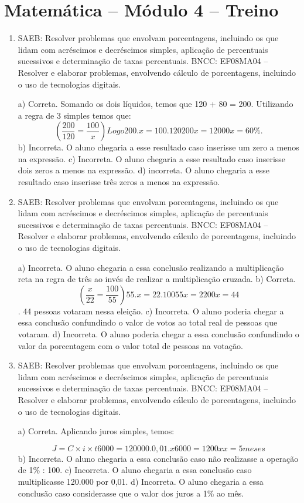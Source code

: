 \section*{Matemática – Módulo 4 – Treino}
\begin{enumerate}
\item SAEB: Resolver problemas que envolvam porcentagens, incluindo os que
lidam com acréscimos e decréscimos simples, aplicação de percentuais
sucessivos e determinação de taxas percentuais.
BNCC: EF08MA04 -- Resolver e elaborar problemas, envolvendo cálculo de
porcentagens, incluindo o uso de tecnologias digitais.

a) Correta. Somando os dois líquidos, temos que 120 + 80 = 200.
Utilizando a regra de 3 simples temos que:
$$(\frac{200}{120} = \frac{100}{x})
Logo 200 . x = 100 . 120
200 x = 12 000
x = 60\%.$$
b) Incorreta. O aluno chegaria a esse resultado caso inserisse um
zero a menos na expressão.
c) Incorreta. O aluno chegaria a esse resultado caso inserisse dois
zeros a menos na expressão.
d) incorreta. O aluno chegaria a esse resultado caso inserisse três
zeros a menos na expressão.

\item SAEB: Resolver problemas que envolvam porcentagens, incluindo os que
lidam com acréscimos e decréscimos simples, aplicação de percentuais
sucessivos e determinação de taxas percentuais.
BNCC: EF08MA04 -- Resolver e elaborar problemas, envolvendo cálculo de
porcentagens, incluindo o uso de tecnologias digitais.

a) Incorreta. O aluno chegaria a essa conclusão realizando a
multiplicação reta na regra de três ao invés de realizar a multiplicação
cruzada.
b) Correta. $$(\frac{x}{22} = \frac{100}{55})
55 . x = 22 . 100
55x = 2200
x = 44$$. 44 pessoas votaram nessa eleição.
c) Incorreta. O aluno poderia chegar a essa conclusão confundindo o
valor de votos ao total real de pessoas que votaram.
d) Incorreta. O aluno poderia chegar a essa conclusão confundindo o
valor da porcentagem com o valor total de pessoas na votação.

\item SAEB: Resolver problemas que envolvam porcentagens, incluindo os que
lidam com acréscimos e decréscimos simples, aplicação de percentuais
sucessivos e determinação de taxas percentuais.
BNCC: EF08MA04 -- Resolver e elaborar problemas, envolvendo cálculo de
porcentagens, incluindo o uso de tecnologias digitais.

a) Correta. Aplicando juros simples, temos:

$$J = C × i × t

6 000 = 120 000 . 0,01 . x

6 000 = 1200 x

x = 5 meses$$
b) Incorreta. O aluno chegaria a essa conclusão caso não realizasse
a operação de 1\% : 100.
c) Incorreta. O aluno chegaria a essa conclusão caso multiplicasse
120.000 por 0,01.
d) Incorreta. O aluno chegaria a essa conclusão caso considerasse
que o valor dos juros a 1\% ao mês.
\end{enumerate}


